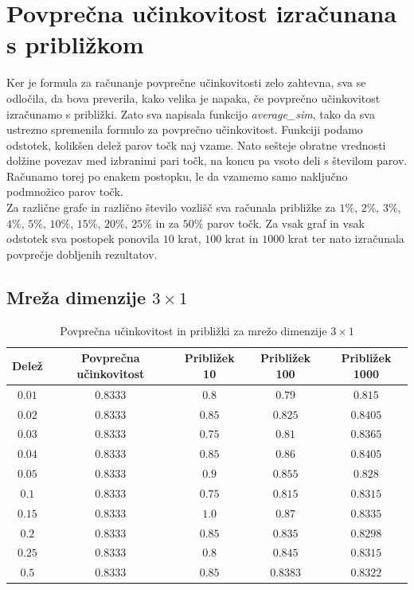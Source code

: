 \documentclass[a4paper, 16pt]{article}
\begin{document}
\section{Povprečna učinkovitost izračunana s približkom}
Ker je formula za računanje povprečne učinkovitosti zelo zahtevna, sva se odločila, da bova preverila, kako velika je napaka,
če povprečno učinkovitost izračunamo s približki.
Zato sva napisala funkcijo \emph{average\_sim}, tako da sva ustrezno spremenila formulo za povprečno učinkovitost. Funkciji podamo odstotek, kolikšen delež parov točk naj vzame. 
Nato sešteje obratne vrednosti dolžine povezav med izbranimi pari točk, na koncu pa vsoto deli s številom parov. Računamo torej po enakem postopku, le da vzamemo samo naključno podmnožico
parov točk.\\
Za različne grafe in različno število vozlišč sva računala približke za $1 \%$, $2\%$, $3\%$, $4 \%$, $5 \%$, $10 \%$, $15 \%$, $20 \%$, $25 \%$ in za $50 \%$ parov točk.
Za vsak graf in vsak odstotek sva postopek ponovila $10$ krat, $100$ krat in $1000$ krat ter nato izračunala povprečje dobljenih rezultatov.


\newpage

    \subsection{Mreža dimenzije $3 \times 1$}
    \begin{table}[!h]
        \centering
        \begin{tabular}{c|c|c|c|c}
            Delež & Povprečna učinkovitost & Približek 10 & Približek 100 & Približek 1000 \\ \hline
            $0.01$ & $0.8333$ & $0.8$  & $0.79$   & $0.815$ \\
            $0.02$ & $0.8333$ & $0.85$ & $0.825$  & $0.8405$ \\
            $0.03$ & $0.8333$ & $0.75$ & $0.81$   & $0.8365$ \\
            $0.04$ & $0.8333$ & $0.85$ & $0.86$   & $0.8405$ \\
            $0.05$ & $0.8333$ & $0.9$  & $0.855$  & $0.828$ \\
            $0.1$  & $0.8333$ & $0.75$ & $0.815$  & $0.8315$ \\
            $0.15$ & $0.8333$ & $1.0$  & $0.87$   & $0.8335$ \\
            $0.2$  & $0.8333$ & $0.85$ & $0.835$  & $0.8298$ \\
            $0.25$ & $0.8333$ & $0.8$  & $0.845$  & $0.8315$ \\
            $0.5$  & $0.8333$ & $0.85$ & $0.8383$ & $0.8322$ \\

        \end{tabular}
        \caption{Povprečna učinkovitost in približki za mrežo dimenzije $3 \times 1$}
        \label{table: 6}
    \end{table}
\end{document}

